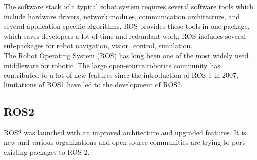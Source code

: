 	The software stack of a typical robot system requires several software tools which include hardware drivers, network modules, communication architecture, and several application-specific algorithms. ROS provides these tools in one package, which saves developers a lot of time and redundant work. ROS includes several sub-packages for robot navigation, vision, control, simulation.\\
	
	The Robot Operating System (ROS) has long been one of the most widely used middleware for robotic. The large open-source robotics community has contributed to a lot of new features since the introduction of ROS 1 in 2007, limitations of ROS1 have led to the development of ROS2.\cite{ros2Basic}\\

	\subsection{ROS2} 
	\label{Grundlagen:ROS:ROs2}
	\gls{ROS2} was launched with an improved architecture and upgraded features. It is new and various organizations and open-source communities are trying to port existing packages to ROS 2.\cite{ros2Basic} \\
	

